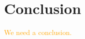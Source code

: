 \documentclass[preprint,12pt]{elsarticle}
\theoremstyle{definition}
\theoremstyle{remark}
\newcommand{\afcomm}[1]{\textcolor{orange}{#1}}
\begin{document}




\section{Conclusion}
\afcomm{We need a conclusion.}

{}
\end{document}
